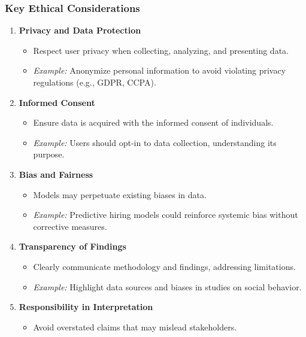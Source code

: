 \documentclass{beamer}
\begin{document}
\begin{frame}[fragile]
    \frametitle{Key Ethical Considerations}
    \begin{enumerate}
        \item \textbf{Privacy and Data Protection}
        \begin{itemize}
            \item Respect user privacy when collecting, analyzing, and presenting data.
            \item \textit{Example:} Anonymize personal information to avoid violating privacy regulations (e.g., GDPR, CCPA).
        \end{itemize}
        
        \item \textbf{Informed Consent}
        \begin{itemize}
            \item Ensure data is acquired with the informed consent of individuals.
            \item \textit{Example:} Users should opt-in to data collection, understanding its purpose.
        \end{itemize}
        
        \item \textbf{Bias and Fairness}
        \begin{itemize}
            \item Models may perpetuate existing biases in data.
            \item \textit{Example:} Predictive hiring models could reinforce systemic bias without corrective measures.
        \end{itemize}
        
        \item \textbf{Transparency of Findings}
        \begin{itemize}
            \item Clearly communicate methodology and findings, addressing limitations.
            \item \textit{Example:} Highlight data sources and biases in studies on social behavior.
        \end{itemize}
        
        \item \textbf{Responsibility in Interpretation}
        \begin{itemize}
            \item Avoid overstated claims that may mislead stakeholders. 
        \end{itemize}
    \end{enumerate}
\end{frame}
\end{document}
